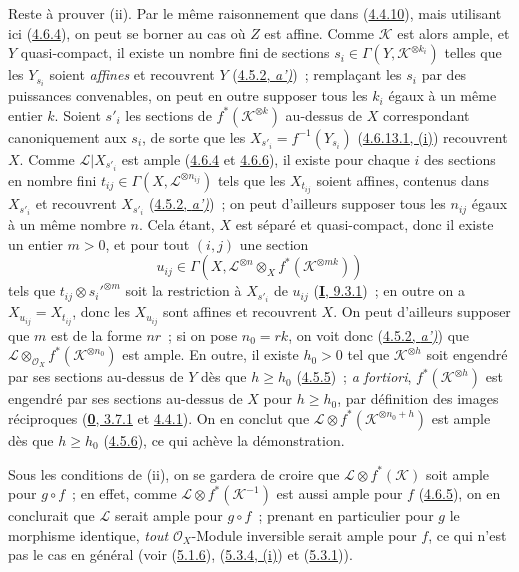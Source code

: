 Reste à prouver (ii). Par le même raisonnement que dans
(\hyperref[II.4.4.10-fr]{4.4.10}), mais utilisant ici
(\hyperref[II.4.6.4-fr]{4.6.4}), on peut se borner au cas où $Z$ est
affine. Comme $\mathcal{K}$ est alors ample, et $Y$ quasi-compact, il existe
un nombre fini de sections $s_i\in\Gamma(Y,\mathcal{K}^{\otimes k_i})$
telles que les $Y_{s_i}$
soient \emph{affines} et recouvrent $Y$
(\hyperref[II.4.5.2-fr]{4.5.2, \emph{a')}})~;
remplaçant les $s_i$ par des puissances convenables, on peut en outre
supposer tous les $k_i$ égaux à un même entier $k$. Soient $s'_i$ les
sections de $f^*(\mathcal{K}^{\otimes k})$ au-dessus de $X$ correspondant
canoniquement aux $s_i$, de sorte que les
$X_{s'_i}=f^{-1}(Y_{s_i})$ (\hyperref[II.4.6.13.1-fr]{4.6.13.1, (i)})
recouvrent $X$. Comme $\mathcal{L}|X_{s'_i}$ est ample
(\hyperref[II.4.6.4-fr]{4.6.4} et
\hyperref[II.4.6.6-fr]{4.6.6}), il existe pour chaque $i$ des sections en
nombre fini $t_{ij}\in\Gamma(X,\mathcal{L}^{\otimes n_{ij}})$ tels que les
$X_{t_{ij}}$ soient affines, contenus dans $X_{s'_i}$ et recouvrent
$X_{s'_i}$ (\hyperref[II.4.5.2-fr]{4.5.2, \emph{a')}})~; on peut d'ailleurs
supposer tous les $n_{ij}$ égaux à un même nombre $n$. Cela étant, $X$ est
séparé et quasi-compact, donc il existe un entier $m>0$, et pour tout
$(i,j)$ une section
\[
  u_{ij}\in\Gamma(X,\mathcal{L}^{\otimes n}\otimes_X
  f^*(\mathcal{K}^{\otimes mk}))
\]
tels que $t_{ij}\otimes s_i'^{\otimes m}$ soit la restriction à $X_{s'_i}$
de $u_{ij}$ (\hyperref[I.9.3.1-fr]{\textbf{I}, 9.3.1})~; en outre on a
$X_{u_{ij}}=X_{t_{ij}}$, donc les $X_{u_{ij}}$ sont affines et recouvrent
$X$. On peut d'ailleurs supposer que $m$ est de la forme $nr$~; si on pose
$n_0=rk$, on voit donc (\hyperref[II.4.5.2-fr]{4.5.2, \emph{a')}}) que
$\mathcal{L}\otimes_{\mathcal{O}_X}f^*(\mathcal{K}^{\otimes n_0})$ est
ample. En outre,
il existe $h_0>0$ tel que $\mathcal{K}^{\otimes h}$ soit engendré par ses
sections au-dessus de $Y$ dès que $h\geq h_0$
(\hyperref[II.4.5.5-fr]{4.5.5})~; \emph{a fortiori},
$f^*(\mathcal{K}^{\otimes h})$ est engendré par ses sections au-dessus de
$X$ pour $h\geq h_0$, par définition des images réciproques
(\hyperref[0.3.7.1-fr]{\textbf{0}, 3.7.1} et
\hyperref[0.4.4.1-fr]{4.4.1}). On en conclut que
$\mathcal{L}\otimes f^*(\mathcal{K}^{\otimes n_0+h})$ est ample dès que
$h\geq h_0$ (\hyperref[II.4.5.6-fr]{4.5.6}), ce qui achève la
démonstration.

\begin{remark}[4.6.14]
\label{II.4.6.14-fr}
Sous les conditions de (ii), on se gardera de croire que
$\mathcal{L}\otimes f^*(\mathcal{K})$ soit ample pour $g\circ f$~; en effet,
comme $\mathcal{L}\otimes f^*(\mathcal{K}^{-1})$ est aussi ample pour $f$
(\hyperref[II.4.6.5-fr]{4.6.5}), on en conclurait que $\mathcal{L}$ serait
ample pour $g\circ f$~; prenant en particulier pour $g$ le morphisme
identique, \emph{tout} $\mathcal{O}_X$-Module inversible serait ample pour $f$, ce
qui n'est pas le cas en général (voir (\hyperref[II.5.1.6-fr]{5.1.6}),
(\hyperref[II.5.3.4-fr]{5.3.4, (i)}) et
(\hyperref[II.5.3.1-fr]{5.3.1})).
\end{remark}

